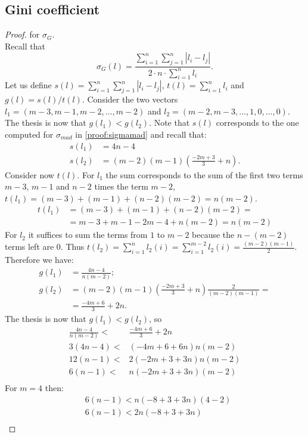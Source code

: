 \subsection{Gini coefficient}
\begin{proof} for $\sigma_{G}$. \\
		Recall that 
	\[\sigma_{G}(l)= \frac{\sum_{i=1}^{n}\sum_{j=1}^{n}|l_i-l_j|}{2 \cdot n \cdot \sum_{i=1}^{n} l_i}.\]	
	Let us define $s(l)= \sum_{i=1}^{n}\sum_{j=1}^{n}|l_i-l_j|$, $t(l)=\sum_{i=1}^{n} l_i$ and $g(l)=s(l)/t(l)$. Consider the two vectors $l_1=(m-3, m-1, m-2, \dots, m-2)$ and $l_2=(m-2, m-3, \dots, 1, 0, \dots, 0)$. The thesis is now that $g(l_1) < g(l_2)$.
	Note that $s(l)$ corresponds to the one computed for $\sigma_{mad}$ in \cref{proof:sigmamad} and recall that:
	\begin{align*}
		s(l_1)&=4n-4\\
		s(l_2)&= (m - 2) (m - 1) \left(\frac{-2m + 3}{3} + n\right).
	\end{align*}
	Consider now $t(l)$. For $l_1$ the sum corresponds to the sum of the first two terms $m-3$, $m-1$ and $n-2$ times the term $m-2$, $t(l_1)=(m-3)+(m-1)+(n-2)(m-2)=n(m-2)$.
	\begin{align*}
		t(l_1)&=(m-3)+(m-1)+(n-2)(m-2)=\\
		&=m-3+m-1-2m-4+n(m-2)=n(m-2)
	\end{align*}
	For $l_2$ it suffices to sum the terms from $1$ to $m-2$ because the $n-(m-2)$ terms left are $0$. Thus $t(l_2)=\sum_{i=1}^{n} l_2(i)=\sum_{i=1}^{m-2} l_2(i)=\frac{(m-2)(m-1)}{2}$.
	Therefore we have:
	\begin{align*}
		g(l_1)&=\frac{4n-4}{n(m-2)};\\
		g(l_2)&=(m - 2) (m - 1) \left(\frac{-2m + 3}{3} + n\right)\frac{2}{(m - 2) (m - 1)}=\\
		&=\frac{-4m + 6}{3} + 2n.
	\end{align*}
	The thesis is now that $g(l_1) < g(l_2)$, so
	\begin{align*}
		\frac{4n-4}{n(m-2)}<&\frac{-4m + 6}{3} + 2n \\
		3(4n-4)<&(-4m+6+6n)n(m-2)\\
		12(n-1)<&2(-2m+3+3n)n(m-2)\\
		6(n-1)<&n(-2m+3+3n)(m-2)\\
	\end{align*}
	For $m=4$ then:
	\begin{align*}
		&6(n-1)<n(-8+3+3n)(4-2)\\
		&6(n-1)<2n(-8+3+3n)\\

\end{align*}
\end{proof}
